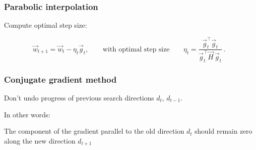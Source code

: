 \begin{frame}\frametitle{Parabolic interpolation}


Compute optimal step size:

\begin{equation}
	  \vec{w}_{t+1} = \vec{w}_t - \eta_{t} \vec{g}_t,
	  \qquad \text{with optimal step size} \qquad
	  \eta_{t} = \frac{\vec{g}_t^\top\vec{g}_t}{\vec{g}_t^\top\vec{H}\,\vec{g}_t} \,.
\end{equation}

\end{frame}


\begin{frame}\frametitle{Conjugate gradient method}

Don't undo progress of previous search directions $d_{t}$, $d_{t-1}$.

In other words:

The component of the gradient parallel to the old direction $d_{t}$ should
remain zero along the new direction $d_{t+1}$

\end{frame}

